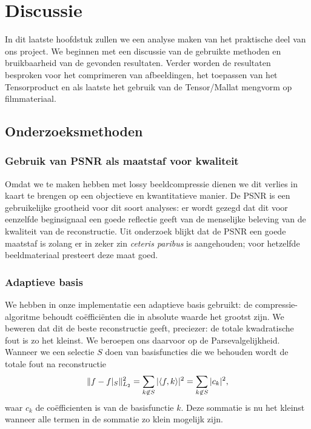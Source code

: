 \chapter{Discussie}
\label{discH}
In dit laatste hoofdstuk zullen we een analyse maken van het praktische deel van ons project.
We beginnen met een discussie van de gebruikte methoden en bruikbaarheid van de gevonden resultaten.
Verder worden de resultaten besproken voor het comprimeren van afbeeldingen, het toepassen van het 
Tensorproduct en als laatste het gebruik van de Tensor/Mallat mengvorm op filmmateriaal. 

\section{Onderzoeksmethoden}
\subsection{Gebruik van PSNR als maatstaf voor kwaliteit}
Omdat we te maken hebben met lossy beeldcompressie dienen we dit verlies in kaart te brengen op een 
objectieve en kwantitatieve manier. 
De PSNR is een gebruikelijke grootheid voor dit soort analyses: er wordt gezegd dat dit voor eenzelfde 
beginsignaal een goede reflectie geeft van de menselijke beleving van de kwaliteit van de reconstructie.
Uit onderzoek \cite{PSNR} blijkt dat de PSNR een goede maatstaf is zolang er in zeker zin \emph{ceteris paribus}
is aangehouden; voor hetzelfde beeldmateriaal presteert deze maat goed.

\subsection{Adaptieve basis}
\label{adaptief_parseval}
We hebben in onze implementatie een adaptieve basis gebruikt: de compressie-algoritme behoudt co\"effici\"enten
die in absolute waarde het grootst zijn. 
We beweren dat dit de beste reconstructie geeft, preciezer: de totale kwadratische fout is zo het kleinst.
We beroepen ons daarvoor op de Parsevalgelijkheid. Wanneer we een selectie $S$ doen van basisfuncties die we behouden
wordt de totale fout na reconstructie
\[
\|f-f|_{S}\|^2_{L_2} = \sum_{k\not\in S} |\langle f , k \rangle|^2 = \sum_{k\not\in S} |c_k|^2,
\]
waar $c_k$ de co\"efficienten is van de basisfunctie $k$. 
Deze sommatie is nu het kleinst wanneer alle termen in de sommatie zo klein mogelijk zijn. 

